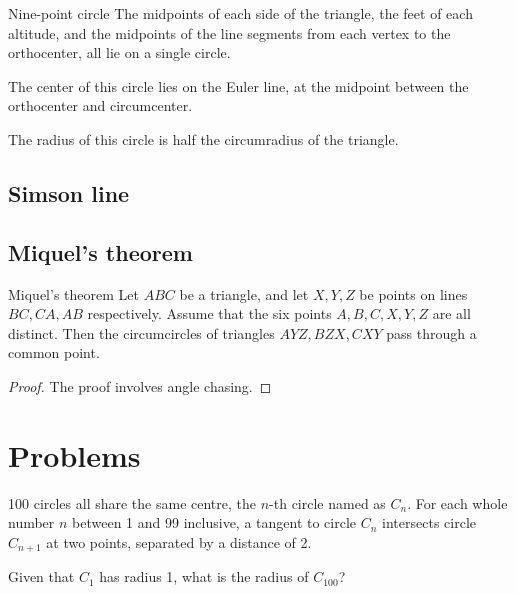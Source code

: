 \begin{thrm}{Nine-point circle}{}
The midpoints of each side of the triangle, the feet of each altitude, and the midpoints of the line segments from each vertex to the orthocenter, all lie on a single circle.
\end{thrm}

The center of this circle lies on the Euler line, at the midpoint between the orthocenter and circumcenter.

The radius of this circle is half the circumradius of the triangle.

\subsection{Simson line}
\subsection{Miquel's theorem}
\begin{thrm}{Miquel's theorem}{}
Let $ABC$ be a triangle, and let $X, Y, Z$ be points on lines $BC, CA, AB$ respectively. Assume that the six points $A, B, C, X, Y, Z$ are all distinct. Then the circumcircles of triangles $AYZ, BZX, CXY$ pass through a common point.
\end{thrm}

\begin{proof}
The proof involves angle chasing.
\end{proof}

\pagebreak


\section*{Problems}
\begin{prbm}
100 circles all share the same centre, the $n$-th circle named as $C_n$. For each whole number $n$ between 1 and 99 inclusive, a tangent to circle $C_n$ intersects circle $C_{n+1}$ at two points, separated by a distance of 2.

Given that $C_1$ has radius 1, what is the radius of $C_{100}$?
\end{prbm}

